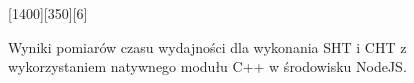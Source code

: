 

\begin{figure}[h]
     {

        \seqReferenceLookup
    }{

        \seqReferenceCircle
    }[1400][350][6]

    \caption{Wyniki pomiarów czasu wydajności dla wykonania SHT i CHT z wykorzystaniem natywnego modułu C++ w środowisku NodeJS.}
    \label{plot:cpu-addon}
\end{figure}
